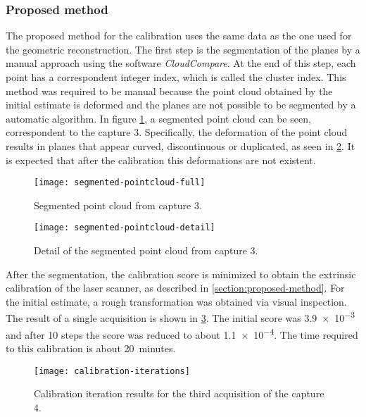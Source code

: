 \subsubsection{Proposed method}

The proposed method for the calibration uses the same data as the one used for the geometric reconstruction. The first step is the segmentation of the planes by a manual approach using the software \textit{CloudCompare}. At the end of this step, each point has a correspondent integer index, which is called the cluster index. This method was required to be manual because the point cloud obtained by the initial estimate is deformed and the planes are not possible to be segmented by a automatic algorithm. In figure \cref{figure:segmented-pointcloud-full}, a segmented point cloud can be seen, correspondent to the capture 3. Specifically, the deformation of the point cloud results in planes that appear curved, discontinuous or duplicated, as seen in \cref{figure:segmented-pointcloud-detail}. It is expected that after the calibration this deformations are not existent.

\begin{figure}[h]
    
    \centering
    \texttt{[image: segmented-pointcloud-full]}
    \caption{Segmented point cloud from capture 3.}
    \label{figure:segmented-pointcloud-full}

\end{figure}

\begin{figure}[h]
    \centering
    \texttt{[image: segmented-pointcloud-detail]}
    \caption{Detail of the segmented point cloud from capture 3.}
    \label{figure:segmented-pointcloud-detail}

\end{figure}

After the segmentation, the calibration score is minimized to obtain the extrinsic calibration of the laser scanner, as described in \cref{section:proposed-method}. For the initial estimate, a rough transformation was obtained via visual inspection. The result of a single acquisition is shown in \cref{figure:calibration-results-acquisition-3}. The initial score was \num{3.9e-3} and after 10 steps the score was reduced to about \num{1.1e-4}. The time required to this calibration is about \num{20}~minutes.

\begin{figure}[h]

    \centering
    \texttt{[image: calibration-iterations]}
    
    \caption{Calibration iteration results for the third acquisition of the capture 4.}
    \label{figure:calibration-results-acquisition-3}
\end{figure}

